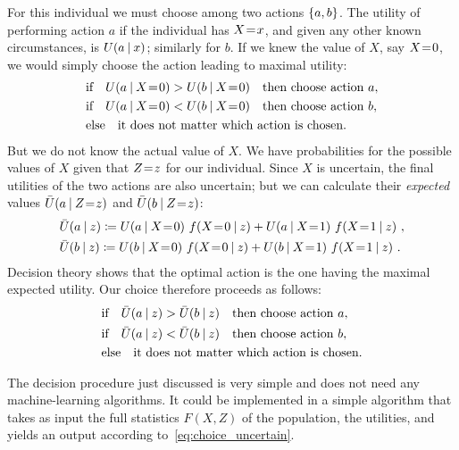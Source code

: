 \documentclass[\ifafour a4paper,12pt,\else a5paper,10pt,\fi%
onecolumn,oneside,article,%
british%
]{memoir}
\theoremstyle{remark}
\theoremstyle{innote}
\newcommand*{\defd}{\coloneqq}
\DeclarePairedDelimiter\set{\{}{\}} %
\renewcommand*{\|}[1][]{\nonscript\:#1\vert\nonscript\:\mathopen{}}
\newcommand*{\mo}[1][=]{\mathrel{\mkern-3.5mu#1\mkern-3.5mu}}
\begin{document}
\medskip

For this individual we must choose among two actions $\set{a, b}$. The
utility of performing action $a$ if the individual has $X\mo x$, and given
any other known circumstances, is $U(a \| x)$; similarly for $b$. If we
knew the value of $X$, say $X\mo 0$, we would simply choose the action
leading to maximal utility:
\begin{equation}
  \label{eq:choice_ex}
  \begin{aligned}
    &\text{if}\quad U(a \| X\mo 0) > U(b \| X\mo 0) \quad\text{then choose action $a$},
\\
      &\text{if}\quad U(a \| X\mo 0) < U(b \| X\mo 0) \quad\text{then choose action $b$},
\\&\text{else}\quad\text{it does not matter which action is chosen}.
  \end{aligned}
\end{equation}
But we do not know the actual value of $X$. We have probabilities for the
possible values of $X$ given that $Z\mo z$ for our individual. Since $X$ is
uncertain, the final utilities of the two actions are also uncertain; but we can
calculate their \emph{expected} values $\bar{U}(a \| Z \mo z)$ and
$\bar{U}(b \| Z \mo z)$:
\begin{equation}
  \label{eq:expe_util}
  \begin{aligned}
    &\bar{U}(a \| z) \defd
    U(a \| X\mo 0)\ f(X\mo 0 \| z) + U(a \| X\mo 1)\ f(X\mo 1 \| z) \ ,
    \\
    &\bar{U}(b \| z) \defd
    U(b \| X\mo 0)\ f(X\mo 0 \| z) + U(b \| X\mo 1)\ f(X\mo 1 \| z) \ .
\end{aligned}
\end{equation}
Decision theory shows that the optimal action is the one having the maximal
expected utility. Our choice therefore proceeds as follows:
\begin{equation}
  \label{eq:choice_uncertain}
  \begin{aligned}
    &\text{if}\quad \bar{U}(a \| z) > \bar{U}(b \| z) \quad\text{then choose action $a$},
\\
      &\text{if}\quad \bar{U}(a \| z) < \bar{U}(b \| z) \quad\text{then choose action $b$},
\\&\text{else}\quad\text{it does not matter which action is chosen}.
  \end{aligned}
\end{equation}

\medskip

The decision procedure just discussed is very simple and does not need any machine-learning algorithms. It could be implemented in a simple algorithm that takes as input the full statistics $F(X,Z)$ of the population, the utilities, and yields an output according to~\eqref{eq:choice_uncertain}.
\end{document}
